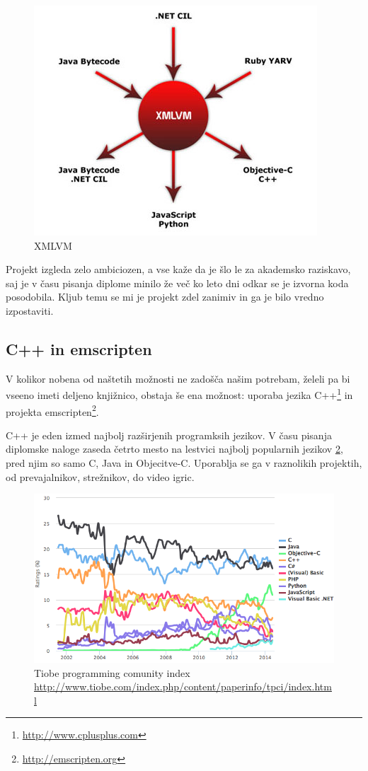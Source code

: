 \begin{figure}
 \includegraphics[scale=0.5]{xmlvm}
 \caption{XMLVM}
 \label{fig:xmlvm}
\end{figure}

Projekt izgleda zelo ambiciozen, a vse kaže da je šlo le za akademsko raziskavo, saj je v času pisanja diplome minilo že več ko leto dni odkar se je izvorna koda posodobila. Kljub temu se mi je projekt zdel zanimiv in ga je bilo vredno izpostaviti.

\subsection{C++ in emscripten}

V kolikor nobena od naštetih možnosti ne zadošča našim potrebam, želeli pa bi vseeno imeti deljeno knjižnico, obstaja še ena možnost: uporaba jezika C++\footnote{\href{http://www.cplusplus.com}{http://www.cplusplus.com}} in projekta emscripten\footnote{\href{http://emscripten.org}{http://emscripten.org}}.

C++ je eden izmed najbolj razširjenih programksih jezikov. V času pisanja diplomske naloge zaseda četrto mesto na lestvici najbolj popularnih jezikov \ref{fig:tiobe-index}, pred njim so samo C, Java in Objecitve-C. Uporablja se ga v raznolikih projektih, od prevajalnikov, strežnikov, do video igric.

\begin{figure}
 \includegraphics[width=\linewidth]{tiobe-index}
 \caption{Tiobe programming comunity index \protect\href{http://www.tiobe.com/index.php/content/paperinfo/tpci/index.html}{http://www.tiobe.com/index.php/content/paperinfo/tpci/index.html}}
 \label{fig:tiobe-index}
\end{figure}

